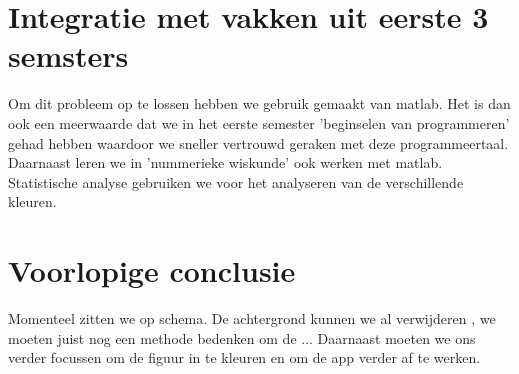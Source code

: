 \documentclass{kulakarticle}
\begin{document}
	
	\section{Integratie met vakken uit eerste 3 semsters}
	Om dit probleem op te lossen hebben we gebruik gemaakt van matlab. Het is dan ook een meerwaarde dat we in het eerste semester 'beginselen van programmeren' gehad hebben waardoor we sneller vertrouwd geraken met deze programmeertaal. Daarnaast leren we in 'nummerieke wiskunde' ook werken met matlab. Statistische analyse gebruiken we voor het analyseren van de verschillende kleuren.
	
	\section{Voorlopige conclusie} 
	Momenteel zitten we op schema. De achtergrond kunnen we al verwijderen , we moeten juist nog een methode bedenken om de ... Daarnaast moeten we ons verder focussen om de figuur in te kleuren en om de app verder af te werken.
	
	
\end{document}
